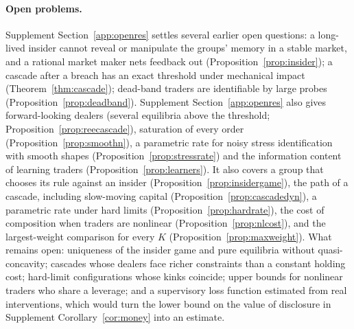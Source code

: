 \paragraph{Open problems.} Supplement Section~\ref{app:openres} settles several earlier open questions: a long-lived insider cannot reveal or manipulate the groups' memory in a stable market, and a rational market maker nets feedback out (Proposition~\ref{prop:insider}); a cascade after a breach has an exact threshold under mechanical impact (Theorem~\ref{thm:cascade}); dead-band traders are identifiable by large probes (Proposition~\ref{prop:deadband}). Supplement Section~\ref{app:openres} also gives forward-looking dealers (several equilibria above the threshold; Proposition~\ref{prop:reecascade}), saturation of every order (Proposition~\ref{prop:smoothn}), a parametric rate for noisy stress identification with smooth shapes (Proposition~\ref{prop:stressrate}) and the information content of learning traders (Proposition~\ref{prop:learners}). It also covers a group that chooses its rule against an insider (Proposition~\ref{prop:insidergame}), the path of a cascade, including slow-moving capital (Proposition~\ref{prop:cascadedyn}), a parametric rate under hard limits (Proposition~\ref{prop:hardrate}), the cost of composition when traders are nonlinear (Proposition~\ref{prop:nlcost}), and the largest-weight comparison for every $K$ (Proposition~\ref{prop:maxweight}). What remains open: uniqueness of the insider game and pure equilibria without quasi-concavity; cascades whose dealers face richer constraints than a constant holding cost; hard-limit configurations whose kinks coincide; upper bounds for nonlinear traders who share a leverage; and a supervisory loss function estimated from real interventions, which would turn the lower bound on the value of disclosure in Supplement Corollary~\ref{cor:money} into an estimate.

